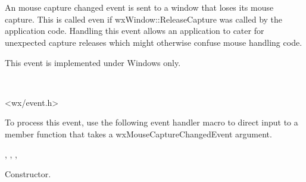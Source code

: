 \section{}\label{wxmousecapturechangedevent}

An mouse capture changed event is sent to a window that loses its
mouse capture. This is called even if wxWindow::ReleaseCapture
was called by the application code. Handling this event allows
an application to cater for unexpected capture releases which
might otherwise confuse mouse handling code.

This event is implemented under Windows only.


\\


<wx/event.h>




To process this event, use the following event handler macro to direct input to a member
function that takes a wxMouseCaptureChangedEvent argument.

\twocolwidtha{7cm}
\begin{twocollist}\itemsep=0pt
\end{twocollist}


, 
, 
, 


\label{wxmousecapturechangedeventctor}


Constructor.

\label{wxmousecapturechangedeventgetcapturedwindow}

